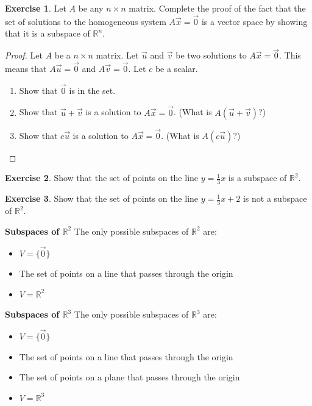 \documentclass{beamer}
\newcommand{\R}{\mathbb{R}}
\newcommand{\fn}{\insertframenumber}
\theoremstyle{definition}
\newtheorem{exercise}{Exercise}
\begin{document}
\begin{frame}{\fn}
\begin{exercise}
	Let $A$ be any $n\times n$ matrix.  Complete the proof of the fact that the set of solutions to the homogeneous system $A\vec x=\vec 0$ is a vector space by showing that it is a subspace of $\R^n$.
	\begin{proof}
		Let $A$ be a $n\times n$ matrix.  Let $\vec u$ and $\vec v$ be two solutions to $A\vec x=\vec 0$.
		This means that $A\vec u=\vec 0$ and $A\vec v=\vec 0$.  Let $c$ be a scalar.
		\begin{enumerate}[label=(\alph*)]
			\item Show that $\vec 0$ is in the set.
			\item Show that $\vec u+\vec v$ is a solution to $A\vec x=\vec 0$.  (What is $A(\vec u+\vec v)$?)
			\item Show that $c\vec u$ is a solution to $A\vec x=\vec 0$. (What is $A(c\vec u)$?)
		\end{enumerate}
	\end{proof}
\end{exercise}
\end{frame}
\begin{frame}{\fn}
	\begin{exercise}
		Show that the set of points on the line $y=\frac{1}{3} x$ is a subspace of $\R^2$.
	\end{exercise}
	\begin{exercise}
		Show that the set of points on the line $y=\frac{1}{3}x+2$ is not a subspace of $\R^2$.
	\end{exercise}
\end{frame}
\begin{frame}{\fn}
	\begin{block}{\textbf{Subspaces of $\R^2$}}
		The only possible subspaces of $\R^2$ are:
		\begin{itemize}[label=--]
			\item $V=\{\vec 0\}$
			\item The set of points on a line that passes through the origin
			\item $V=\R^2$
		\end{itemize}
	\end{block}
\end{frame}
\begin{frame}{\fn}
\begin{block}{\textbf{Subspaces of $\R^3$}}
	The only possible subspaces of $\R^3$ are:
	\begin{itemize}[label=--]
		\item $V=\{\vec 0\}$
		\item The set of points on a line that passes through the origin
		\item The set of points on a plane that passes through the origin
		\item $V=\R^3$
	\end{itemize}
\end{block}
\end{frame}
\end{document}

